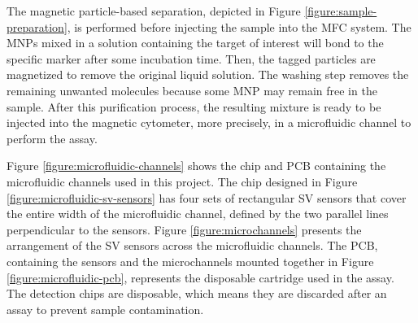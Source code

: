 The magnetic particle-based separation, depicted in Figure \ref{figure:sample-preparation}, is performed before injecting the sample into the \ac{MFC} system. The \ac{MNP}s mixed in a solution containing the target of interest will bond to the specific marker after some incubation time. Then, the tagged particles are magnetized to remove the original liquid solution. The washing step removes the remaining unwanted molecules because some \ac{MNP} may remain free in the sample. After this purification process, the resulting mixture is ready to be injected into the magnetic cytometer, more precisely, in a microfluidic channel to perform the assay.

Figure \ref{figure:microfluidic-channels} shows the chip and \ac{PCB} containing the microfluidic channels used in this project. The chip designed in Figure \ref{figure:microfluidic-sv-sensors} has four sets of rectangular \ac{SV} sensors that cover the entire width of the microfluidic channel, defined by the two parallel lines perpendicular to the sensors. Figure \ref{figure:microchannels} presents the arrangement of the \ac{SV} sensors across the microfluidic channels. The \ac{PCB}, containing the sensors and the microchannels mounted together in Figure \ref{figure:microfluidic-pcb}, represents the disposable cartridge used in the assay. The detection chips are disposable, which means they are discarded after an assay to prevent sample contamination.

